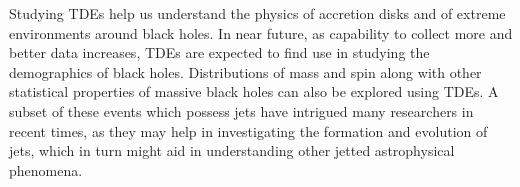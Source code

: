 \documentclass{tda}
\begin{document}
Studying TDEs help us understand the physics of accretion disks and of extreme environments around black holes. In near future, as capability to collect more and better data increases, TDEs are expected to find use in studying the demographics of black holes. Distributions of mass and spin along with other statistical properties of massive black holes can also be explored using TDEs. A subset of these events which possess jets have intrigued many researchers in recent times, as they may help in investigating the formation and evolution of jets, which in turn might aid in understanding other jetted astrophysical phenomena.

\clearpage
\printbibliography
\end{document}
